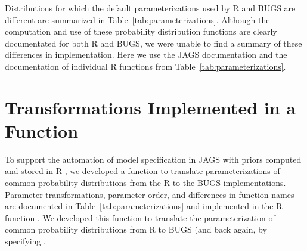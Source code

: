 Distributions for which the default parameterizations used by R and BUGS are different are summarized in Table~\ref{tab:parameterizations}. 
Although the computation and use of these probability distribution functions are clearly documentated for both R and BUGS, we were unable to find a summary of these differences in implementation.
Here we use the JAGS documentation \citep{plummer2011} and the documentation of individual R functions from Table~\ref{tab:parameterizations}.

\section{Transformations  Implemented in a Function}

To support the automation of model specification in JAGS with priors computed and stored in R \citep{lebauer2012ffb}, we developed a function to translate parameterizations of common probability distributions from the R to the BUGS implementations.
Parameter transformations, parameter order, and differences in function names are documented in Table~\ref{tab:parameterizations} and implemented in the R function . 
We developed this function to translate the parameterization of common probability distributions from R to BUGS (and back again, by specifying .


